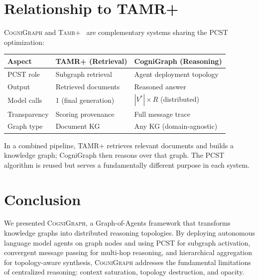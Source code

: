 \documentclass[a4paper,11pt]{article}
\theoremstyle{definition}
\newcommand{\cogni}{\textsc{CogniGraph}}
\newcommand{\tamr}{\textsc{Tamr+}}
\begin{document}
\section{Relationship to TAMR+}
\label{sec:tamr}

\cogni{} and \tamr{}~\cite{tamrplus2026} are complementary systems sharing the PCST optimization:

\begin{center}
\begin{tabular}{lll}
\toprule
\textbf{Aspect} & \textbf{TAMR+ (Retrieval)} & \textbf{CogniGraph (Reasoning)} \\
\midrule
PCST role & Subgraph retrieval & Agent deployment topology \\
Output & Retrieved documents & Reasoned answer \\
Model calls & 1 (final generation) & $|V^*| \times R$ (distributed) \\
Transparency & Scoring provenance & Full message trace \\
Graph type & Document KG & Any KG (domain-agnostic) \\
\bottomrule
\end{tabular}
\end{center}

In a combined pipeline, TAMR+ retrieves relevant documents and builds a knowledge graph; CogniGraph then reasons over that graph. The PCST algorithm is reused but serves a fundamentally different purpose in each system.

\section{Conclusion}
\label{sec:conclusion}

We presented \cogni{}, a Graph-of-Agents framework that transforms knowledge graphs into distributed reasoning topologies.
By deploying autonomous language model agents on graph nodes and using PCST for subgraph activation, convergent message passing for multi-hop reasoning, and hierarchical aggregation for topology-aware synthesis, \cogni{} addresses the fundamental limitations of centralized reasoning: context saturation, topology destruction, and opacity.
\end{document}
